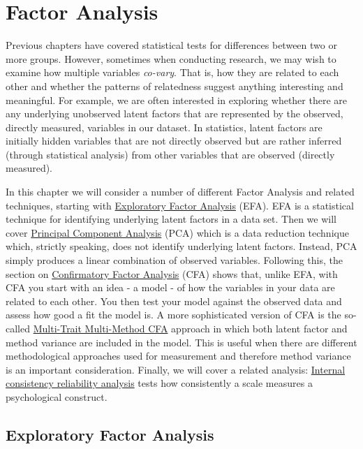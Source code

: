 \documentclass[
  a4paper,
]{book}
\begin{document}
\hypertarget{factor-analysis}{%
\chapter{Factor Analysis}\label{factor-analysis}}

Previous chapters have covered statistical tests for differences between
two or more groups. However, sometimes when conducting research, we may
wish to examine how multiple variables \emph{co-vary}. That is, how they
are related to each other and whether the patterns of relatedness
suggest anything interesting and meaningful. For example, we are often
interested in exploring whether there are any underlying unobserved
latent factors that are represented by the observed, directly measured,
variables in our dataset. In statistics, latent factors are initially
hidden variables that are not directly observed but are rather inferred
(through statistical analysis) from other variables that are observed
(directly measured).

In this chapter we will consider a number of different Factor Analysis
and related techniques, starting with
\protect\hyperlink{exploratory-factor-analysis}{Exploratory Factor
Analysis} (EFA). EFA is a statistical technique for identifying
underlying latent factors in a data set. Then we will cover
\protect\hyperlink{principal-component-analysis}{Principal Component
Analysis} (PCA) which is a data reduction technique which, strictly
speaking, does not identify underlying latent factors. Instead, PCA
simply produces a linear combination of observed variables. Following
this, the section on
\protect\hyperlink{confirmatory-factor-analysis}{Confirmatory Factor
Analysis} (CFA) shows that, unlike EFA, with CFA you start with an idea
- a model - of how the variables in your data are related to each other.
You then test your model against the observed data and assess how good a
fit the model is. A more sophisticated version of CFA is the so-called
\protect\hyperlink{multi-trait-multi-method-cfa}{Multi-Trait
Multi-Method CFA} approach in which both latent factor and method
variance are included in the model. This is useful when there are
different methodological approaches used for measurement and therefore
method variance is an important consideration. Finally, we will cover a
related analysis:
\protect\hyperlink{sec-Internal-consistency-reliability-analysis}{Internal
consistency reliability analysis} tests how consistently a scale
measures a psychological construct.

\hypertarget{exploratory-factor-analysis}{%
\section{Exploratory Factor
Analysis}\label{exploratory-factor-analysis}}
\end{document}
